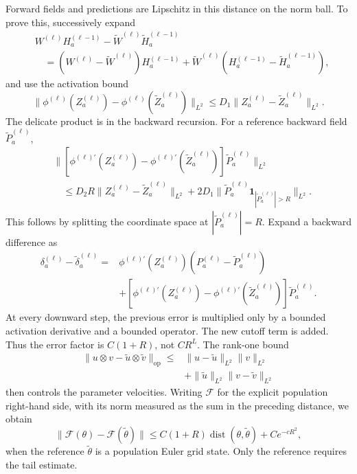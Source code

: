 Forward fields and predictions are Lipschitz in this distance on the
norm ball.  To prove this, successively expand
\begin{align*}
 &W^{(\ell)}H_a^{(\ell-1)}
          -\widetilde W^{(\ell)}\widetilde H_a^{(\ell-1)}\\
 &\quad=(W^{(\ell)}-\widetilde W^{(\ell)})H_a^{(\ell-1)}
       +\widetilde W^{(\ell)}
          (H_a^{(\ell-1)}-\widetilde H_a^{(\ell-1)}),
\end{align*}
and use the activation bound
\[
 \|\phi^{(\ell)}(Z_a^{(\ell)})
           -\phi^{(\ell)}(\widetilde Z_a^{(\ell)})\|_{L^2}
 \le D_1\|Z_a^{(\ell)}-\widetilde Z_a^{(\ell)}\|_{L^2}.
\]
The delicate product is in the backward recursion.  For a reference
backward field $\widetilde P_a^{(\ell)}$,
\begin{align*}
 &\|[\phi^{(\ell)\prime}(Z_a^{(\ell)})
     -\phi^{(\ell)\prime}(\widetilde Z_a^{(\ell)})]
                                    \widetilde P_a^{(\ell)}\|_{L^2}\\
 &\quad\le D_2R\|Z_a^{(\ell)}-\widetilde Z_a^{(\ell)}\|_{L^2}
 +2D_1\|\widetilde P_a^{(\ell)}
                   \mathbf{1}_{|\widetilde P_a^{(\ell)}|>R}\|_{L^2}.
\end{align*}
This follows by splitting the coordinate space at
$|\widetilde P_a^{(\ell)}|=R$.  Expand a backward difference as
\begin{align*}
 \delta_a^{(\ell)}-\widetilde\delta_a^{(\ell)}
 ={}&\phi^{(\ell)\prime}(Z_a^{(\ell)})
                         (P_a^{(\ell)}-\widetilde P_a^{(\ell)})\\
 &+[\phi^{(\ell)\prime}(Z_a^{(\ell)})
     -\phi^{(\ell)\prime}(\widetilde Z_a^{(\ell)})]
                                    \widetilde P_a^{(\ell)}.
\end{align*}
At every downward step, the previous error is multiplied only by a
bounded activation derivative and a bounded operator.  The new cutoff
term is added.  Thus the error factor is $C(1+R)$, not $CR^L$.
The rank-one bound
\begin{align*}
 \|u\otimes v-\widetilde u\otimes\widetilde v\|_{\operatorname{op}}
 \le{}&\|u-\widetilde u\|_{L^2}\|v\|_{L^2}\\
 &+\|\widetilde u\|_{L^2}\|v-\widetilde v\|_{L^2}
\end{align*}
then controls the parameter velocities.  Writing $\mathcal F$ for the
explicit population right-hand side, with its norm measured as the
sum in the preceding distance, we obtain
\begin{equation}
 \|\mathcal F(\theta)-\mathcal F(\widetilde\theta)\|
 \le C(1+R)\operatorname{dist}(\theta,\widetilde\theta)
          +Ce^{-cR^2},
 \label{eq:app-localization}
\end{equation}
when the reference $\widetilde\theta$ is a population Euler grid state.
Only the reference requires the tail estimate.

